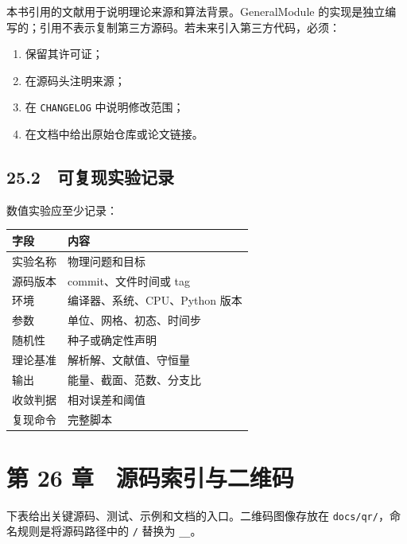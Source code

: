 \documentclass[
  a4paper,
]{ctexbook}
\providecommand{\tightlist}{%
  \setlength{\itemsep}{0pt}\setlength{\parskip}{0pt}}
\begin{document}
本书引用的文献用于说明理论来源和算法背景。GeneralModule
的实现是独立编写的；引用不表示复制第三方源码。若未来引入第三方代码，必须：

\begin{enumerate}
\def\labelenumi{\arabic{enumi}.}
\tightlist
\item
  保留其许可证；
\item
  在源码头注明来源；
\item
  在 \texttt{CHANGELOG} 中说明修改范围；
\item
  在文档中给出原始仓库或论文链接。
\end{enumerate}

\hypertarget{ux53efux590dux73b0ux5b9eux9a8cux8bb0ux5f55}{%
\subsection{25.2　可复现实验记录}\label{ux53efux590dux73b0ux5b9eux9a8cux8bb0ux5f55}}

数值实验应至少记录：

\begin{longtable}[]{@{}ll@{}}
\toprule
字段 & 内容\tabularnewline
\midrule
\endhead
实验名称 & 物理问题和目标\tabularnewline
源码版本 & commit、文件时间或 tag\tabularnewline
环境 & 编译器、系统、CPU、Python 版本\tabularnewline
参数 & 单位、网格、初态、时间步\tabularnewline
随机性 & 种子或确定性声明\tabularnewline
理论基准 & 解析解、文献值、守恒量\tabularnewline
输出 & 能量、截面、范数、分支比\tabularnewline
收敛判据 & 相对误差和阈值\tabularnewline
复现命令 & 完整脚本\tabularnewline
\bottomrule
\end{longtable}

\hypertarget{ux7b2c-26-ux7ae0-ux6e90ux7801ux7d22ux5f15ux4e0eux4e8cux7ef4ux7801}{%
\section{第 26
章　源码索引与二维码}\label{ux7b2c-26-ux7ae0-ux6e90ux7801ux7d22ux5f15ux4e0eux4e8cux7ef4ux7801}}

下表给出关键源码、测试、示例和文档的入口。二维码图像存放在
\texttt{docs/qr/}，命名规则是将源码路径中的 \texttt{/} 替换为
\texttt{\_\_}。
\end{document}
